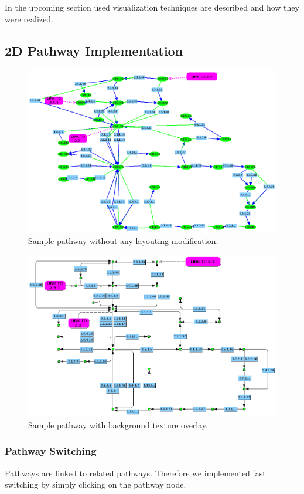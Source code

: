In the upcoming section used visualization techniques are described and how they were realized.

\subsection{2D Pathway Implementation}

\begin{figure}[ht]
  \centering
    \includegraphics[width=0.7\linewidth]{gfx/sample_pathway_jgraph}
  \caption{Sample pathway without any layouting modification.}
  \label{fig:sample_pathway_jgraph}
\end{figure}

\begin{figure}[ht]
  \centering
    \includegraphics[width=0.7\linewidth]{gfx/sample_pathway_jgraph_background}
  \caption{Sample pathway with background texture overlay.}
  \label{fig:sample_pathway_jgraph_background}
\end{figure}

\subsubsection{Pathway Switching}

Pathways are linked to related pathways. Therefore we implemented fast switching by simply clicking on the pathway node.

